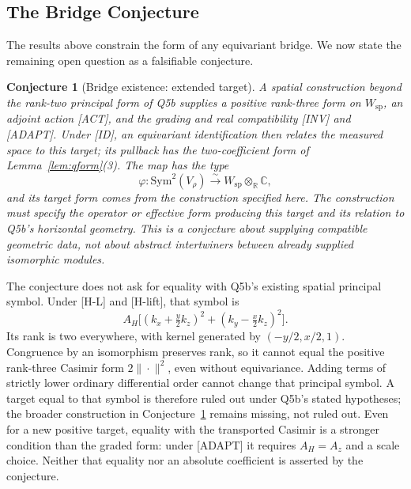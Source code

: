 \documentclass[11pt,a4paper]{article}
\newtheorem{conjecture}[theorem]{Conjecture}
\newcommand{\Vr}{V_\rho}
\newcommand{\Sym}{\mathrm{Sym}}
\begin{document}
  \subsection{The Bridge Conjecture}
    \label{sec:conj}

    The results above constrain the form of any equivariant bridge.
    We now state the remaining open question as a falsifiable conjecture.

    \begin{conjecture}[Bridge existence: extended target]
      \label{conj:bridge}
      A spatial construction beyond the rank-two principal form of Q5b supplies a positive
      rank-three form on $W_{\mathrm{sp}}$, an adjoint action [ACT], and the grading and real
      compatibility [INV] and [ADAPT].
      Under [ID], an equivariant identification then relates the measured space to this target;
      its pullback has the two-coefficient form of Lemma~\ref{lem:qform}(3).
      The map has the type
      \begin{equation}
        \varphi:\Sym^2(\Vr)\xrightarrow{\sim}W_{\mathrm{sp}}\otimes_\mathbb{R}\mathbb{C},
      \end{equation}
      and its target form comes from the construction specified here.
      The construction must specify the operator or effective form producing this target and
      its relation to Q5b's horizontal geometry.
      This is a conjecture about supplying compatible geometric data, not about abstract
      intertwiners between already supplied isomorphic modules.
    \end{conjecture}

    \noindent
    The conjecture does not ask for equality with Q5b's existing spatial principal symbol.
    Under [H-L] and [H-lift], that symbol is
    \[
      A_H\bigl[(k_x+\tfrac y2 k_z)^2+(k_y-\tfrac x2 k_z)^2\bigr].
    \]
    Its rank is two everywhere, with kernel generated by $(-y/2,x/2,1)$.
    Congruence by an isomorphism preserves rank, so it cannot equal the positive rank-three
    Casimir form $2\|\cdot\|^2$, even without equivariance.
    Adding terms of strictly lower ordinary differential order cannot change that principal
    symbol.
    A target equal to that symbol is therefore ruled out under Q5b's stated hypotheses;
    the broader construction in Conjecture~\ref{conj:bridge} remains missing, not ruled out.
    Even for a new positive target, equality with the transported Casimir is a stronger condition
    than the graded form: under [ADAPT] it requires $A_H=A_z$ and a scale choice.
    Neither that equality nor an absolute coefficient is asserted by the conjecture.
\end{document}
